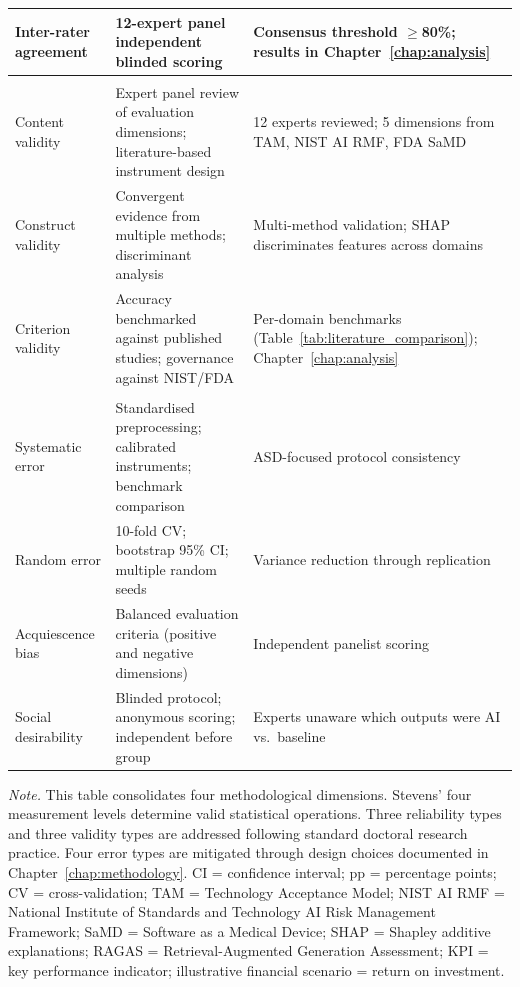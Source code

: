 {\begin{xltabular}{\textwidth}{@{} >{\raggedright\arraybackslash}p{2.2cm} L L @{}}
Inter-rater agreement & 12-expert panel independent blinded scoring & Consensus threshold $\geq$80\%; results in Chapter~\ref{chap:analysis} \\
\midrule
{} \\
\addlinespace
Content validity & Expert panel review of evaluation dimensions; literature-based instrument design & 12 experts reviewed; 5 dimensions from TAM, NIST AI RMF, FDA SaMD \\
Construct validity & Convergent evidence from multiple methods; discriminant analysis & Multi-method validation; SHAP discriminates features across domains \\
Criterion validity & Accuracy benchmarked against published studies; governance against NIST/FDA & Per-domain benchmarks (Table~\ref{tab:literature_comparison}); Chapter~\ref{chap:analysis} \\
\midrule
{} \\
\addlinespace
Systematic error & Standardised preprocessing; calibrated instruments; benchmark comparison & ASD-focused protocol consistency \\
Random error & 10-fold CV; bootstrap 95\% CI; multiple random seeds & Variance reduction through replication \\
Acquiescence bias & Balanced evaluation criteria (positive and negative dimensions) & Independent panelist scoring \\
Social desirability & Blinded protocol; anonymous scoring; independent before group & Experts unaware which outputs were AI vs.\ baseline \\
\end{xltabular}}
\vspace{0.5em}
\noindent\textit{Note.} This table consolidates four methodological dimensions. Stevens' four measurement levels determine valid statistical operations. Three reliability types and three validity types are addressed following standard doctoral research practice. Four error types are mitigated through design choices documented in Chapter~\ref{chap:methodology}. CI = confidence interval; pp = percentage points; CV = cross-validation; TAM = Technology Acceptance Model; NIST AI RMF = National Institute of Standards and Technology AI Risk Management Framework; SaMD = Software as a Medical Device; SHAP = Shapley additive explanations; RAGAS = Retrieval-Augmented Generation Assessment; KPI = key performance indicator; illustrative financial scenario = return on investment.

